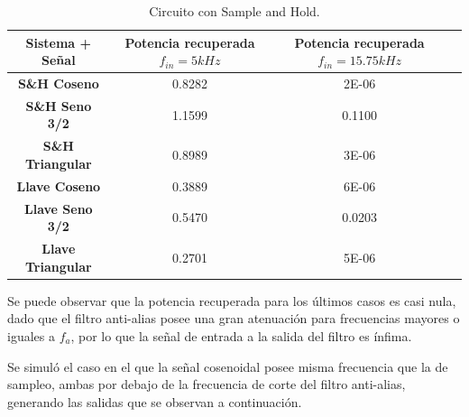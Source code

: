 \begin{table}[H]
\centering
\begin{tabular}{cccc}
\hline
\textbf{Sistema + Señal}  & \textbf{Potencia recuperada $f_{in}=5kHz$} & \textbf{Potencia recuperada $f_{in}=15.75kHz$} \\ \hline
\textbf{S\&H Coseno}     & 0.8282   & 2E-06\\
\textbf{S\&H Seno 3/2}   & 1.1599  & 0.1100\\
\textbf{S\&H Triangular} & 0.8989  & 3E-06\\
\textbf{Llave Coseno}     & 0.3889 & 6E-06 \\
\textbf{Llave Seno 3/2}   & 0.5470  & 0.0203\\
\textbf{Llave Triangular} & 0.2701	& 5E-06\\ \hline
\end{tabular}
\caption{Circuito con Sample and Hold.}
\label{tab:res3}
\end{table}

Se puede observar que la potencia recuperada para los últimos casos es casi nula, dado que el filtro anti-alias posee una gran atenuación para frecuencias mayores o iguales a $f_a$, por lo que la señal de entrada a la salida del filtro es ínfima.

Se simuló el caso en el que la señal cosenoidal posee misma frecuencia que la de sampleo, ambas por debajo de la frecuencia de corte del filtro anti-alias, generando las salidas que se observan a continuación.

